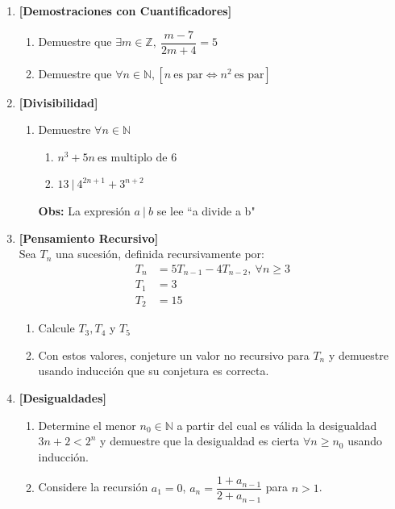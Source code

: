 \documentclass[letterpaper,11pt]{article}
\newcommand{\N}{\mathbb N}
\newcommand{\Z}{\mathbb Z}
\theoremstyle{plain}
\begin{document}
\begin{enumerate}[\bf P1.]   
    \item \textbf{[Demostraciones con Cuantificadores]}
    \begin{enumerate}
        \item Demuestre que $\exists m \in \Z, ~ \dfrac{m-7}{2m+4}=5$
        \item Demuestre que $\forall n \in \N, [n ~\text{es par} \Longleftrightarrow n^{2} ~\text{es par}]$
    \end{enumerate}
    
    \item \textbf{[Divisibilidad]}
        \begin{enumerate}
            \item Demuestre $\forall n \in \N$
                \begin{enumerate}
                    \item $n^3+5n ~ \text{es multiplo de } 6$
                    \item $13 ~ | ~ 4^{2n+1}+3^{n+2}$
                \end{enumerate}
                \textbf{Obs: }La expresión $a ~|~ b$ se lee ``a divide a b"
        \end{enumerate}

    \item \textbf{[Pensamiento Recursivo]}\\ Sea $T_{n}$ una sucesión, definida recursivamente por:
        \begin{align*}
            T_{n}&=5T_{n-1}-4T_{n-2}, ~ \forall n \geq 3\\
            T_{1}&=3\\
            T_{2}&=15
        \end{align*}

        \begin{enumerate}
            \item Calcule $T_{3}, T_{4}$ y $T_{5}$
            \item Con estos valores, conjeture un valor no recursivo para $T_{n}$ y demuestre usando inducción que su conjetura es correcta.
        \end{enumerate}
        
    \item \textbf{[Desigualdades]}
        \begin{enumerate}
            \item Determine el menor $n_{0}\in \N$ a partir del cual es válida la desigualdad $3n + 2 < 2^{n}$ y demuestre que la desigualdad es cierta $\forall n \geq n_{0}$ usando inducción.
            \item Considere la recursión $a_1=0$, $a_n=\dfrac{1+a_{n-1}}{2+a_{n-1}}$ para $n>1$.
            

\end{enumerate}
\end{enumerate}
\end{document}
